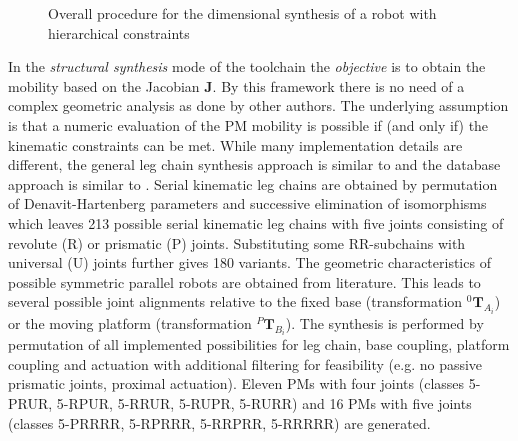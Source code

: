 \documentclass[
	graybox,
	vecphys] %
	{svmult}
\newcommand{\bm}[1]{\boldsymbol{#1}}
\newcommand{\trmat}[2]{{{ }^{#1}\boldsymbol{T}}_{#2}}
\begin{document}

\begin{figure}[b!]
\vspace{-0.5cm} %
\centering

\caption{Overall procedure for the dimensional synthesis of a robot with hierarchical constraints}
\vspace{-0.1cm}
\label{fig:flowchart_optimization}
\end{figure}

\pagebreak

In the \emph{structural synthesis} mode of the toolchain 
the \emph{objective} is to obtain the mobility based on the Jacobian $\bm{J}$.
%
%
By this framework there is no need of a complex geometric analysis as done by other authors.
The underlying assumption is that a numeric evaluation of the PM mobility is possible if (and only if) the kinematic constraints can be met.
%
While many implementation details are different, the general leg chain synthesis approach is similar to \cite{Gogu2008} and the database approach is similar to \cite{DingCaoCaiKec2015}.
Serial kinematic leg chains are obtained by permutation of Denavit-Hartenberg parameters and successive elimination of isomorphisms which leaves 213 possible serial kinematic leg chains with five joints consisting of revolute (R) or prismatic (P) joints.
Substituting some RR-subchains with universal (U) joints further gives 180 variants.
The geometric characteristics of possible symmetric parallel robots are obtained from literature.
This leads to several possible joint alignments relative to the fixed base (transformation $\trmat{0}{A_i}$) or the moving platform (transformation $\trmat{P}{B_i}$). %
The synthesis is performed by permutation of all implemented possibilities for leg chain, base coupling, platform coupling and actuation with additional filtering for feasibility (e.g. no passive prismatic joints, proximal actuation). %
Eleven PMs with four joints (classes 5-PRUR, 5-RPUR, 5-RRUR, 5-RUPR, 5-RURR) and 16 PMs with five joints (classes 5-PRRRR, 5-RPRRR, 5-RRPRR, 5-RRRRR) are generated.
\end{document}
